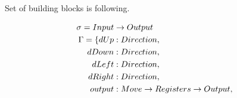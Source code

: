\documentclass[12pt,a4paper]{report}
\begin{document}
Set of building blocks is following.

\begin{align*}
\sigma = Input &\rightarrow Output\\
\Gamma = \{
dUp              &: Direction                                       ,\\              
dDown            &: Direction                                       ,\\              
dLeft            &: Direction                                       ,\\              
dRight           &: Direction                                       ,\\            
output           &: Move \rightarrow Registers \rightarrow Output                   ,\\            
\end{align*}
\end{document}
